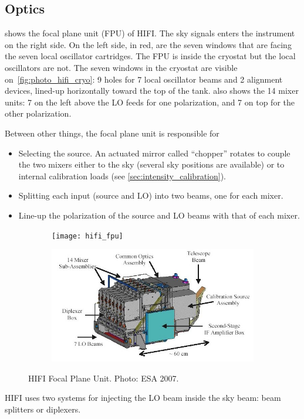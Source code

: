 \subsection{Optics}

 shows the focal plane unit (FPU) of HIFI.
The sky signals enters the instrument on the right side.
On the left side, in red, are the seven windows that are facing the seven local oscillator cartridges.
The FPU is inside the cryostat but the local oscillators are not.
The seven windows in the cryostat are visible on~\cref{fig:photo_hifi_cryo}: 9 holes for 7 local oscillator beams and 2 alignment devices, lined-up horizontally toward the top of the tank.
 also shows the 14 mixer units: 7 on the left above the LO feeds for one polarization, and 7 on top for the other polarization.

\begin{samepage}
Between other things, the focal plane unit is responsible for
\begin{itemize}[nolistsep,noitemsep]
    \item Selecting the source.  An actuated mirror called ``chopper'' rotates to couple the two mixers either to the sky (several sky positions are available) or to internal calibration loads (see \cref{sec:intensity_calibration}).
    \item Splitting each input (source and LO) into two beams, one for each mixer.
    \item Line-up the polarization of the source and LO beams with that of each mixer.
\end{itemize}
\end{samepage}

\begin{figure}
    \centering
    \begin{subfigure}[c]{.4\textwidth}
        \texttt{[image: hifi\_fpu]}
    \end{subfigure}%
    \begin{subfigure}[c]{.6\textwidth}
        \includegraphics[width=\textwidth]{hifi_fpu_schematic}
    \end{subfigure}
    \caption{HIFI Focal Plane Unit.  Photo: ESA 2007.}
    \label{fig:photo_hifi_fpu}
\end{figure}
HIFI uses two systems for injecting the LO beam inside the sky beam: beam splitters or diplexers.


